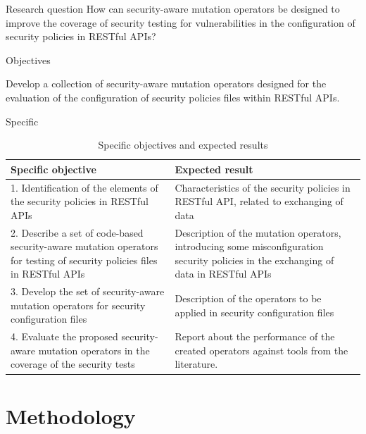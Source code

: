 \documentclass[10pt]{beamer}
\theoremstyle{remark}
\theoremstyle{definition}
\begin{document}
\begin{frame}{Research question}
How can security-aware mutation operators be designed to improve the coverage of security testing for vulnerabilities in the configuration of security policies in RESTful APIs?
\end{frame}


\begin{frame}{Objectives}

Develop a collection of security-aware mutation operators designed for the evaluation of the configuration of security policies files within RESTful APIs.

\end{frame}

\begin{frame}{Specific}

\begin{table}[H]
    \centering
    \begin{tabular}{|p{}|p{}|}
        \hline
         \textbf{Specific objective} & \textbf{Expected result} \\ \hline
         1. Identification of the elements of the security policies in RESTful APIs  &  Characteristics of the security policies in RESTful API, related to exchanging of data   \\  \hline
         2. Describe a set of code-based security-aware mutation operators for testing of security policies   files in RESTful APIs  & Description of the mutation operators, introducing some misconfiguration security policies in the exchanging of data in RESTful APIs\\  \hline
         3. Develop the set of security-aware mutation operators for security configuration files  & Description of the operators to be applied in security configuration files \\  \hline
         4. Evaluate the proposed security-aware mutation operators in the coverage of the security tests  & Report about the performance of the created operators against tools from the literature.
         \\ \hline
    \end{tabular}
    \caption{Specific objectives and expected results}
    \label{tab:objetivos}
\end{table}
\end{frame}

\section{Methodology}
\end{document}
